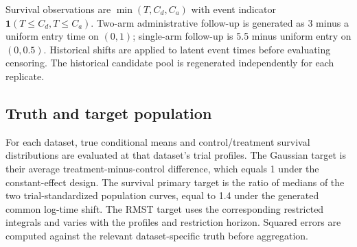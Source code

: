 \documentclass[11pt]{article}
\newcommand{\ind}{\mathbf{1}}
\theoremstyle{remark}\newtheorem{remark}{Remark}[section]
\begin{document}
Survival observations are $\min(T,C_d,C_a)$ with event indicator $\ind(T\leq C_d,T\leq C_a)$. Two-arm administrative follow-up is generated as 3 minus a uniform entry time on $(0,1)$; single-arm follow-up is 5.5 minus uniform entry on $(0,0.5)$. Historical shifts are applied to latent event times before evaluating censoring. The historical candidate pool is regenerated independently for each replicate.

\subsection{Truth and target population}\label{sec:E.3}
For each dataset, true conditional means and control/treatment survival distributions are evaluated at that dataset's trial profiles. The Gaussian target is their average treatment-minus-control difference, which equals 1 under the constant-effect design. The survival primary target is the ratio of medians of the two trial-standardized population curves, equal to 1.4 under the generated common log-time shift. The RMST target uses the corresponding restricted integrals and varies with the profiles and restriction horizon. Squared errors are computed against the relevant dataset-specific truth before aggregation.
\end{document}
